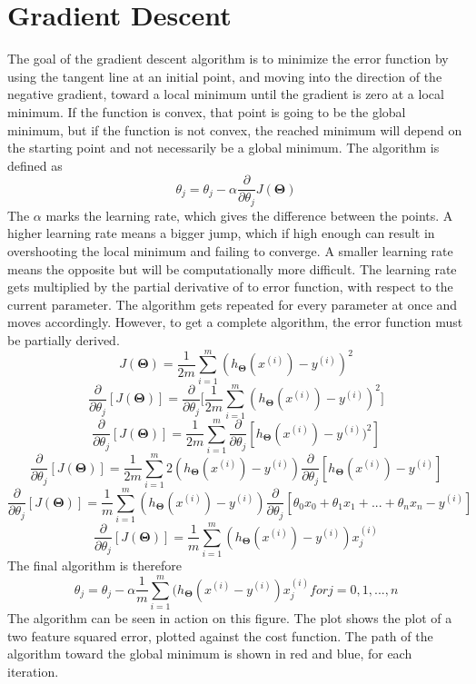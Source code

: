 \documentclass[a4paper,12pt]{article}
\begin{document}
\section{Gradient Descent}
The goal of the gradient descent algorithm is to minimize the error function by using the tangent line at an initial point, and moving into the direction of the negative gradient, toward a local minimum until the gradient is zero at a local minimum. If the function is convex, that point is going to be the global minimum, but if the function is not convex, the reached minimum will depend on the starting point and not necessarily be a global minimum. The algorithm is defined as \[\theta_j = \theta_j - \alpha \frac{\partial}{\partial\theta_j} J(\boldsymbol{\Theta})\] The \(\alpha\) marks the learning rate, which gives the difference between the points. A higher learning rate means a bigger jump, which if high enough can result in overshooting the local minimum and failing to converge. A smaller learning rate means the opposite but will be computationally more difficult. The learning rate gets multiplied by the partial derivative of to error function, with respect to the current parameter. The algorithm gets repeated for every parameter at once and moves accordingly. However, to get a complete algorithm, the error function must be partially derived. 
\[J(\boldsymbol{\Theta}) = \frac{1}{2m} \sum_{i=1}^m (h_{\boldsymbol{\Theta}}(x^{(i)}) - y^{(i)})^2\]
\[\frac{\partial}{\partial\theta_j} [J(\boldsymbol{\Theta})] = \frac{\partial}{\partial\theta_j} \Big[ \frac{1}{2m} \sum_{i=1}^m (h_{\boldsymbol{\Theta}}(x^{(i)}) - y^{(i)})^2\Big]\]
\[\frac{\partial}{\partial\theta_j} [J(\boldsymbol{\Theta})] = \frac{1}{2m} \sum_{i=1}^m \frac{\partial}{\partial\theta_j} [h_{\boldsymbol{\Theta}}(x^{(i)}) - y^{(i)})^2]\]
\[\frac{\partial}{\partial\theta_j} [J(\boldsymbol{\Theta})] = \frac{1}{2m} \sum_{i=1}^m 2(h_{\boldsymbol{\Theta}}(x^{(i)}) - y^{(i)}) \frac{\partial}{\partial\theta_j}[h_{\boldsymbol{\Theta}}(x^{(i)}) - y^{(i)}]\]
\[\frac{\partial}{\partial\theta_j} [J(\boldsymbol{\Theta})] = \frac{1}{m} \sum_{i=1}^m (h_{\boldsymbol{\Theta}}(x^{(i)}) - y^{(i)})\frac{\partial}{\partial\theta_j} [\theta_0x_0+\theta_1x_1+...+\theta_nx_n-y^{(i)}]\]
\[\frac{\partial}{\partial\theta_j} [J(\boldsymbol{\Theta})] = \frac{1}{m} \sum_{i=1}^m (h_{\boldsymbol{\Theta}}(x^{(i)}) - y^{(i)})x_j^{(i)}\]
The final algorithm is therefore
\[\theta_j = \theta_j - \alpha \frac{1}{m} \sum_{i=1}^m (h_{\boldsymbol{\Theta}}(x^{(i)} - y^{(i)})x_j^{(i)} for j = 0,1,...,n\]
The algorithm can be seen in action on this figure. The plot shows the plot of a two feature squared error, plotted against the cost function. The path of the algorithm toward the global minimum is shown in red and blue, for each iteration. 
\end{document}
